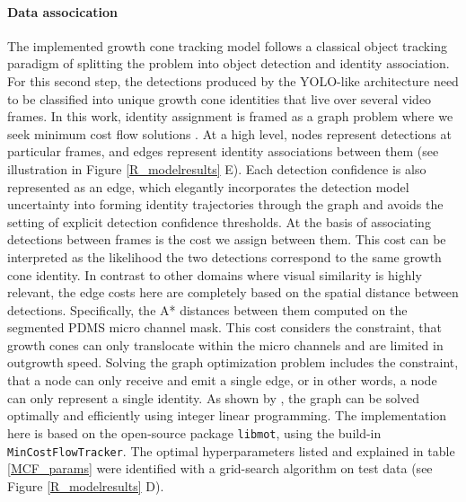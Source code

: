 \paragraph{Data assocication}
\label{data_association}
The implemented growth cone tracking model follows a classical object tracking
paradigm of splitting the problem into object detection and identity
association. For this second step, the detections produced by the YOLO-like
architecture need to be classified into unique growth cone identities that live
over several video frames. In this work, identity assignment is framed as a
graph problem where we seek minimum cost flow solutions \parencite{MCF}. At a
high level, nodes represent detections at particular frames, and edges represent
identity associations between them (see illustration in Figure
\ref{R_modelresults} E). Each detection confidence is also represented as an
edge, which elegantly incorporates the detection model uncertainty into forming
identity trajectories through the graph and avoids the setting of explicit
detection confidence thresholds. At the basis of associating detections between
frames is the cost we assign between them. This cost can be interpreted as the
likelihood the two detections correspond to the same growth cone identity. In
contrast to other domains where visual similarity is highly relevant, the edge
costs here are completely based on the spatial distance between detections.
Specifically, the A* distances \parencite{astar} between them computed on the
segmented PDMS micro channel mask. This cost considers the constraint, that
growth cones can only translocate within the micro channels and are limited in
outgrowth speed. Solving the graph optimization problem includes the constraint,
that a node can only receive and emit a single edge, or in other words, a node
can only represent a single identity. As shown by \cite{MCF}, the graph can be
solved optimally and efficiently using integer linear programming. The
implementation here is based on the open-source package \verb|libmot|, using the
build-in \verb|MinCostFlowTracker|. The optimal hyperparameters listed and
explained in table \ref{MCF_params} were identified with a grid-search
algorithm on test data (see Figure \ref{R_modelresults} D). 




